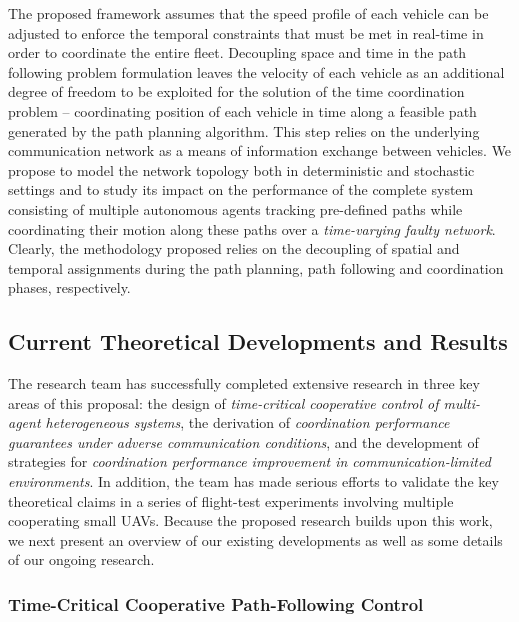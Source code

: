 \documentclass[letter,onecolumn,12pt]{aiaa-tc}
\newcommand{\1}{1_n}
\begin{document}
The proposed framework assumes that the speed profile of each vehicle can be adjusted to enforce the temporal constraints that must be met in real-time in order to coordinate the entire fleet. Decoupling space and time in the path following problem formulation leaves the velocity of each  vehicle as an additional  degree of freedom to be exploited for the solution of the time coordination problem -- coordinating position of each vehicle in time along a feasible path generated by the path planning algorithm.  This step relies on the underlying communication network as a means of information exchange between vehicles. We propose to model the network topology both in deterministic and stochastic settings and to study its impact on the performance of the complete system consisting of multiple autonomous agents tracking pre-defined paths while coordinating their motion along these paths over a \emph{ time-varying faulty network}. Clearly, the methodology proposed relies on the decoupling of spatial and temporal assignments during the path planning, path following and coordination phases, respectively.

\subsection{Current Theoretical Developments and Results}
\label{subsec:current_develop}

The research team has successfully completed extensive research in three key areas of this proposal: the design of \emph{time-critical cooperative control of multi-agent heterogeneous systems}, the derivation of \emph{coordination performance guarantees under adverse communication conditions}, and the development of strategies for \emph{coordination performance improvement in communication-limited environments}. In addition, the team has made serious efforts to validate the key theoretical claims in a series of flight-test experiments involving multiple cooperating small UAVs. Because the proposed research builds upon this work, we next present an overview of our existing developments as well as some details of our ongoing research. %

\subsubsection{Time-Critical Cooperative Path-Following Control}
\end{document}
